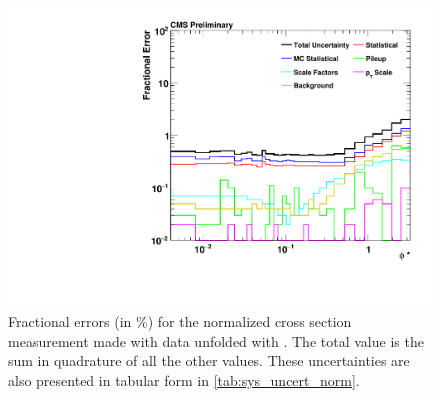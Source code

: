 \begin{figure}[!p]
    \centering
    \includegraphics[width=\textwidth]{figures/data_uncertainty_normalized.pdf}
    \caption[
        Fractional errors for the normalized cross section measurement
        made with data unfolded with \MADGRAPH.
    ]{
        Fractional errors (in \%) for the normalized cross section measurement
        made with data unfolded with \MADGRAPH. The total value is the sum in
        quadrature of all the other values. These uncertainties are also
        presented in tabular form in \cref{tab:sys_uncert_norm}.
    }
    \label{fig:sys_uncert_norm}
\end{figure}
